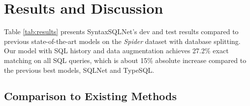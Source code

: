 \documentclass[11pt,a4paper]{article}
\begin{document}
\begin{table*}[ht!]
\centering
{}
\vspace{-2mm}
\caption{F1 scores of Component Matching on all SQL queries on Test set.}
\label{tab:results_component}
\vspace{-3mm}
\end{table*} 











\section{Results and Discussion}

Table \ref{tab:results} presents SyntaxSQLNet's dev and test results compared to previous state-of-the-art models on the \textit{Spider} dataset with database splitting. Our model with SQL history and data augmentation achieves 27.2\% exact matching on all SQL queries, which is about 15\% absolute increase compared to the previous best models, SQLNet and TypeSQL. 

\subsection{Comparison to Existing Methods}
\end{document}
